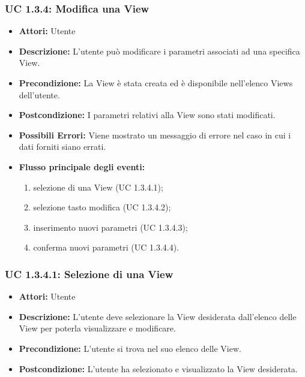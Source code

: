 \subsubsection{UC 1.3.4: Modifica una View}

\begin{itemize}
    \item \textbf{Attori:} Utente
    \item \textbf{Descrizione:} L'utente può modificare i parametri associati ad una specifica View.
    \item \textbf{Precondizione:} La View è stata creata ed è disponibile nell'elenco Views dell'utente.
    \item \textbf{Postcondizione:} I parametri relativi alla View sono stati modificati.

	\item \textbf{Possibili Errori:}
    Viene mostrato un messaggio di errore nel caso in cui i dati forniti siano errati.
    \item \textbf{Flusso principale degli eventi:}

    \begin{enumerate}
        \item selezione di una View (UC 1.3.4.1);
        \item selezione tasto modifica (UC 1.3.4.2);
        \item inserimento nuovi parametri (UC 1.3.4.3);
        \item conferma nuovi parametri (UC 1.3.4.4).
    \end{enumerate}

\end{itemize}

\subsubsection{UC 1.3.4.1: Selezione di una View}

\begin{itemize}
    \item \textbf{Attori:} Utente
    \item \textbf{Descrizione:} L'utente deve selezionare la View desiderata dall'elenco delle View per poterla visualizzare e modificare.
    \item \textbf{Precondizione:} L'utente si trova nel suo elenco delle View.
    \item \textbf{Postcondizione:} L'utente ha selezionato e visualizzato la View desiderata.
\end{itemize}

